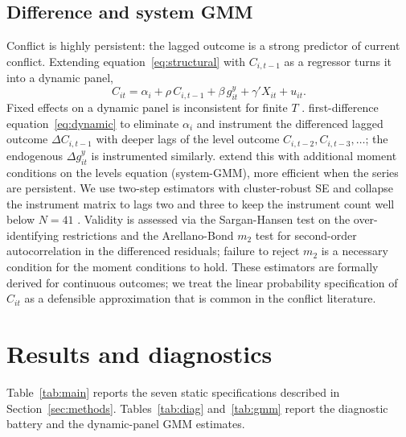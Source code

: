 \documentclass[11pt,a4paper]{article}
\begin{document}
\subsection{Difference and system GMM}\label{sec:gmm}

Conflict is highly persistent: the lagged outcome is a strong predictor
of current conflict. Extending equation~\eqref{eq:structural} with
$C_{i,t-1}$ as a regressor turns it into a dynamic panel,
\begin{equation}
C_{it} = \alpha_i + \rho\, C_{i,t-1} + \beta\, g^{y}_{it}
       + \gamma' X_{it} + u_{it}.
\label{eq:dynamic}
\end{equation}
Fixed effects on a dynamic panel is inconsistent for finite $T$
\citep{Nickell1981}. \citet{ArellanoBond1991} first-difference
equation~\eqref{eq:dynamic} to eliminate $\alpha_i$ and instrument the
differenced lagged outcome $\Delta C_{i,t-1}$ with deeper lags of the
level outcome $C_{i,t-2}, C_{i,t-3}, \ldots$; the endogenous
$\Delta g^{y}_{it}$ is instrumented similarly. \citet{BlundellBond1998}
extend this with additional moment conditions on the levels equation
(system-GMM), more efficient when the series are persistent. We use
two-step estimators with cluster-robust SE and collapse the instrument
matrix to lags two and three to keep the instrument count well below
$N = 41$ \citep{Roodman2009}. Validity is assessed via the
Sargan-Hansen test on the over-identifying restrictions and the
Arellano-Bond $m_2$ test for second-order autocorrelation in the
differenced residuals; failure to reject $m_2$ is a necessary
condition for the moment conditions to hold. These estimators are
formally derived for continuous outcomes; we treat the linear
probability specification of $C_{it}$ as a defensible approximation
that is common in the conflict literature.

\section{Results and diagnostics}\label{sec:results}
Table~\ref{tab:main} reports the seven static specifications described
in Section~\ref{sec:methods}. Tables~\ref{tab:diag}
and~\ref{tab:gmm} report the diagnostic battery and the dynamic-panel
GMM estimates.
\end{document}
